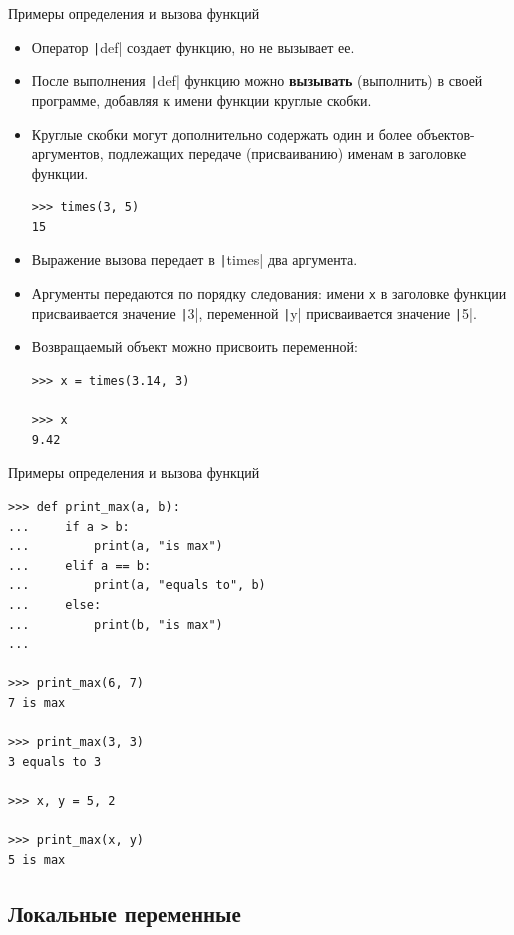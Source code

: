 \documentclass[aspectratio=169]{beamer}%
\begin{document}
\begin{frame}[fragile]{Примеры определения и вызова функций}
\scriptsize
\begin{itemize}
\item Оператор \texttt|def| создает функцию, но не вызывает ее. 
\item После выполнения \texttt|def| функцию можно \textcolor{extraorange}{\textbf{вызывать}} (выполнить) в своей программе, добавляя к имени функции круглые скобки. 
\item Круглые скобки могут дополнительно содержать один и более объектов-аргументов, подлежащих передаче (присваиванию) именам в заголовке функции.

\begin{verbatim}
>>> times(3, 5)
15
\end{verbatim}
\item Выражение вызова передает в \texttt|times| два аргумента. 
\item Аргументы передаются по порядку следования: имени \texttt{x} в заголовке функции присваивается значение \texttt|3|, переменной \texttt|y| присваивается значение \texttt|5|. 
\item Возвращаемый объект можно присвоить переменной:

\begin{verbatim}
>>> x = times(3.14, 3)

>>> x
9.42
\end{verbatim}
\end{itemize}
\vfill
\end{frame}


\begin{frame}[fragile]{Примеры определения и вызова функций}
\scriptsize
\begin{verbatim}
>>> def print_max(a, b):
...     if a > b:
...         print(a, "is max") 
...     elif a == b:
...         print(a, "equals to", b)
...     else:
...         print(b, "is max")
...

>>> print_max(6, 7)
7 is max

>>> print_max(3, 3)
3 equals to 3

>>> x, y = 5, 2

>>> print_max(x, y)
5 is max
\end{verbatim}
\vfill
\end{frame}


\subsection{Локальные переменные}
\end{document}
